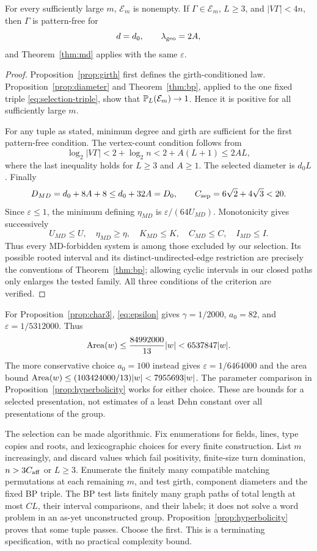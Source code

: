 \begin{proposition}\label{prop:hyperbolicity}
For every sufficiently large $m$, $\mathcal E_m$ is nonempty. If $\Gamma\in\mathcal E_m$, $L\ge3$, and $|V\Gamma|<4n$, then $\Gamma$ is pattern-free for
\[
 d=d_0,\qquad\lambda_{\rm geo}=2A,
\]
and Theorem~\ref{thm:md} applies with the same $\varepsilon$.
\end{proposition}
\begin{proof}
Proposition~\ref{prop:girth} first defines the girth-conditioned law. Proposition~\ref{prop:diameter} and Theorem~\ref{thm:bp}, applied to the one fixed triple \eqref{eq:selection-triple}, show that $\mathbb P_L(\mathcal E_m)\to1$. Hence it is positive for all sufficiently large $m$.

For any tuple as stated, minimum degree and girth are sufficient for the first pattern-free condition. The vertex-count condition follows from
\[
 \log_2|V\Gamma|<2+\log_2n<2+A(L+1)\le2AL,
\]
where the last inequality holds for $L\ge3$ and $A\ge1$. The selected diameter is $d_0L$. Finally
\[
 D_{MD}=d_0+8A+8\le d_0+32A=D_0,
 \qquad C_{\rm sep}=6\sqrt2+4\sqrt3<20.
\]
Since $\varepsilon\le1$, the minimum defining $\eta_{MD}$ is $\varepsilon/(64U_{MD})$. Monotonicity gives successively
\[
 U_{MD}\le U,\quad \eta_{MD}\ge\eta,\quad
 K_{MD}\le K,\quad C_{MD}\le C,\quad I_{MD}\le I.
\]
Thus every MD-forbidden system is among those excluded by our selection. Its possible rooted interval and its distinct-undirected-edge restriction are precisely the conventions of Theorem~\ref{thm:bp}; allowing cyclic intervals in our closed paths only enlarges the tested family. All three conditions of the criterion are verified.
\end{proof}

\begin{remark}
For Proposition~\ref{prop:char3}, \eqref{eq:epsilon} gives $\gamma=1/2000$, $a_0=82$, and $\varepsilon=1/5312000$. Thus
\[
 \operatorname{Area}(w)\le\frac{84992000}{13}|w|<6537847|w|.
\]
The more conservative choice $a_0=100$ instead gives $\varepsilon=1/6464000$ and the area bound \(\operatorname{Area}(w)\le(103424000/13)|w|<7955693|w|\). The parameter comparison in Proposition~\ref{prop:hyperbolicity} works for either choice. These are bounds for a selected presentation, not estimates of a least Dehn constant over all presentations of the group.
\end{remark}

The selection can be made algorithmic. Fix enumerations for fields, lines, type copies and roots, and lexicographic choices for every finite construction. List $m$ increasingly, and discard values which fail positivity, finite-size turn domination, $n>3C_{\rm aff}$ or $L\ge3$. Enumerate the finitely many compatible matching permutations at each remaining $m$, and test girth, component diameters and the fixed BP triple. The BP test lists finitely many graph paths of total length at most $CL$, their interval comparisons, and their labels; it does not solve a word problem in an as-yet unconstructed group. Proposition~\ref{prop:hyperbolicity} proves that some tuple passes. Choose the first. This is a terminating specification, with no practical complexity bound.

